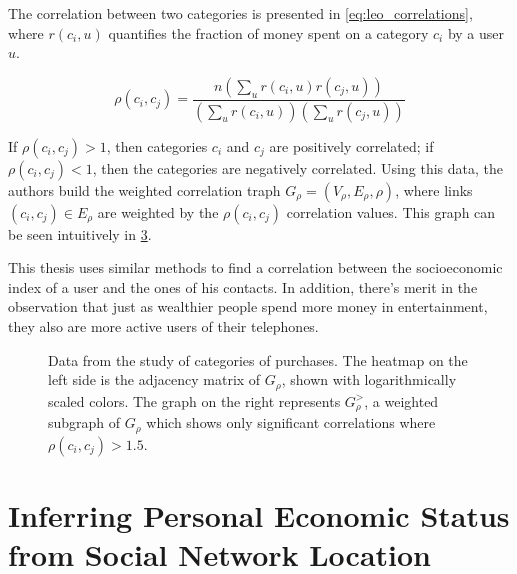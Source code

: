 The correlation between two categories is presented in \cref{eq:leo_correlations}, where $r(c_i, u)$ quantifies the fraction of money spent on a category $c_i$ by a user $u$.

\begin{equation}
\label{eq:leo_correlations}
	\rho \left( c_i, c_j \right) =
		\frac{
			n \left( \sum_u r ( c_i, u ) r ( c_j, u ) \right)
		}
		{
			\left( \sum_u r ( c_i, u ) \right) \left( \sum_u r ( c_j, u ) \right)
		}
\end{equation}

If $\rho(c_i, c_j) > 1$, then categories $c_i$ and $c_j$ are positively correlated; if $\rho(c_i, c_j) < 1$, then the categories are negatively correlated. Using this data, the authors build the weighted correlation traph $G_\rho = (V_\rho, E_\rho, \rho)$, where links $(c_i, c_j) \in E_\rho$ are weighted by the $\rho(c_i, c_j)$ correlation values.
This graph can be seen intuitively in \cref{fig:paper_yannick}.

This thesis uses similar methods to find a correlation between the socioeconomic index of a user and the ones of his contacts. In addition, there's merit in the observation that just as wealthier people spend more money in entertainment, they also are more active users of their telephones.

\begin{figure}
\centering
\begin{subfigure}[t]{.45\textwidth}
\label{fig:service_socioeconomic}
\end{subfigure}
\begin{subfigure}[t]{.45\textwidth}
\label{fig:service_service}
\end{subfigure}
\caption{Data from the study of categories of purchases. The heatmap on the left side is the adjacency matrix of $G_\rho$, shown with logarithmically scaled colors. The graph on the right represents $G_\rho^>$, a weighted subgraph of $G_\rho$ which shows only significant correlations where $\rho(c_i, c_j) > 1.5$.}
\label{fig:paper_yannick}
\end{figure}

\section{Inferring Personal Economic Status from Social Network Location}
\label{sec:luo2017inferring}

